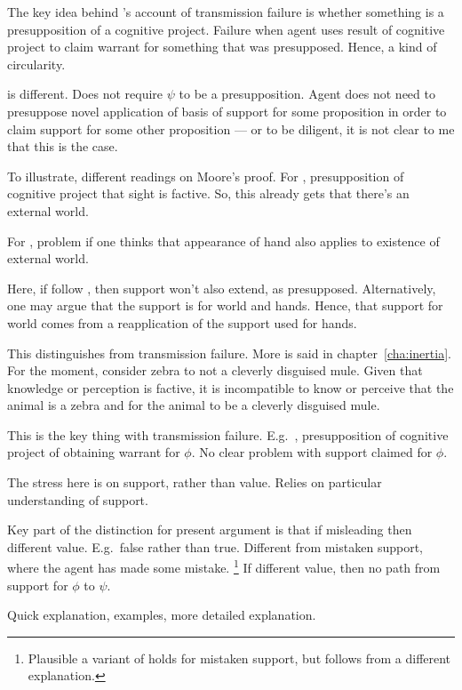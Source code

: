 \begin{note}
  The key idea behind \citeauthor{Wright:2011wn}'s account of transmission failure is whether something is a presupposition of a cognitive project.
  Failure when agent uses result of cognitive project to claim warrant for something that was presupposed.
  Hence, a kind of circularity.

  \nI{} is different.
  Does not require \(\psi\) to be a presupposition.
  Agent does not need to presuppose novel application of basis of support for some proposition in order to claim support for some other proposition --- or to be diligent, it is not clear to me that this is the case.

  To illustrate, different readings on Moore's proof.
  For \citeauthor{Wright:2011wn}, presupposition of cognitive project that sight is factive.
  So, this already gets that there's an external world.

  For \nI{}, problem if one thinks that appearance of hand also applies to existence of external world.

  Here, if follow \citeauthor{Wright:2011wn}, then support won't also extend, as presupposed.
  Alternatively, one may argue that the support is for world and hands.
  Hence, that support for world comes from a reapplication of the support used for hands.

  {
    This distinguishes \nI{} from transmission failure.
    More is said in chapter~\ref{cha:inertia}.
    For the moment, consider zebra to not a cleverly disguised mule.
    Given that knowledge or perception is factive, it is incompatible to know or perceive that the animal is a zebra and for the animal to be a cleverly disguised mule.
  }

  {
    This is the key thing with transmission failure.
  E.g.\ \citeauthor{Wright:2011wn}, presupposition of cognitive project of obtaining warrant for \(\phi\).
  No clear problem with support claimed for \(\phi\).
  }
\end{note}

\begin{note}
  The stress here is on support, rather than value.
  Relies on particular understanding of support.

  Key part of the distinction for present argument is that if misleading then different value.
  E.g.\ false rather than true.
  Different from mistaken support, where the agent has made some mistake.\nolinebreak
  \footnote{
    Plausible a variant of \nI{} holds for mistaken support, but follows from a different explanation.
  }
  If different value, then no path from support for \(\phi\) to \(\psi\).

  Quick explanation, examples, more detailed explanation.
\end{note}


